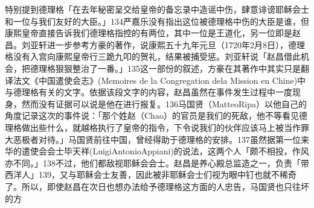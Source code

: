 \vfill
\begin{BookNotes}
\end{BookNotes}

\noindent 特别提到德理格「在去年秘密呈交给皇帝的备忘录中造谣中伤，肆意诽谤耶稣会士和一位与我们友好的大臣。」134严嘉乐没有指出这位被德理格中伤的大臣是谁，但康熙皇帝直接告诉我们德理格指控的有两位，其中一位是王道化，另一位即是赵昌。刘亚轩进一步参考方豪的著作，说康熙五十九年元旦（1720年2月8日），德理格没有入宫向康熙皇帝行三跪九叩的贺礼，结果被捕受惩。刘亚轩说「赵昌借此机会，把德理格狠狠整治了一番。」135这一部份的叙述，方豪在其著作中其实只是翻译法文《中国遣使会志》(Memoires de la Congregation dela Mission en Chine)中与德理格有关的文字。依据该段文字的内容，赵昌虽然在事件发生过程中一度现身，然而没有证据可以说是他在进行报复。136马国贤（MatteoRipa）以他自己的角度记录这次的事件说：「那个姓赵（Chao）的官员是我们的死敌，他不等看见德理格做出些什么，就越格执行了皇帝的指令，下令说我们的伙伴应该马上被当作罪大恶极者对待。」马国贤前往中国，曾经得助于德理格的安排。137虽然据第一位来华的遣使会会士毕天祥(LuigiAntonioAppiani)的说法，这两个人「颇不相投，作风亦不同。」138不过，他们都敌视耶稣会会士。赵昌是养心殿总监造之一，负责「带西洋人」139，又与耶稣会士友善，因此被非耶稣会士们视为眼中钉也就不稀奇了。所以，即使赵昌在次日也想办法给予德理格这方面的人忠告，马国贤也只往坏的方

